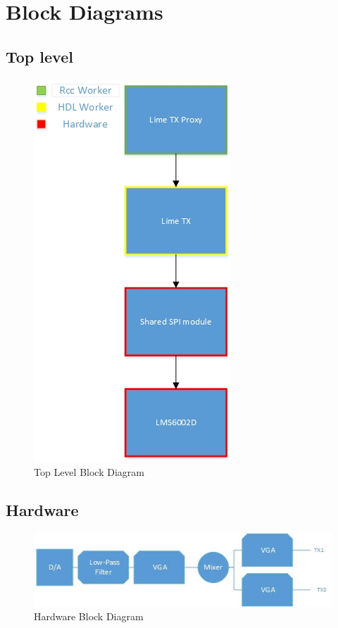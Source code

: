 \documentclass{article}
\begin{document}
\section*{Block Diagrams}
\subsection*{Top level}
\begin{figure}[ht]
	\centerline{\includegraphics[scale=0.7]{lime_TX_toplevel}}
	\caption{Top Level Block Diagram}
	\label{fig:top}
\end{figure}
\vspace{25 mm}

\subsection*{Hardware}
\begin{figure}[ht]
	\centerline{\includegraphics[scale=0.7]{lime_TX_HW}}
	\caption{Hardware Block Diagram}
	\label{fig:hw}
\end{figure}
\vspace{25 mm}
\end{document}

